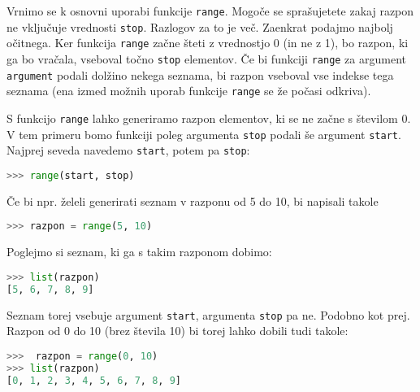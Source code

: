 Vrnimo se k osnovni uporabi funkcije \texttt{range}. Mogoče se sprašujetete zakaj razpon ne vključuje vrednosti \texttt{stop}. Razlogov za to je več. Zaenkrat podajmo najbolj očitnega. Ker funkcija \texttt{range} začne šteti z vrednostjo 0 (in ne z 1), bo razpon, ki ga bo vračala, vseboval točno \texttt{stop} elementov. Če bi funkciji \texttt{range} za argument \texttt{argument} podali dolžino nekega seznama, bi razpon vseboval vse indekse tega seznama (ena izmed možnih uporab funkcije \texttt{range} se že počasi odkriva). 

S funkcijo \texttt{range} lahko generiramo razpon elementov, ki se ne začne s številom 0. V tem primeru bomo funkciji poleg argumenta \texttt{stop} podali še argument \texttt{start}. Najprej seveda navedemo \texttt{start}, potem pa \texttt{stop}:
\begin{lstlisting}[language=Python]
>>> range(start, stop)
\end{lstlisting}
Če bi npr. želeli generirati seznam v razponu od 5 do 10, bi napisali takole
\begin{lstlisting}[language=Python]
>>> razpon = range(5, 10)
\end{lstlisting}
Poglejmo si seznam, ki ga s takim razponom dobimo:
\begin{lstlisting}[language=Python]
>>> list(razpon)
[5, 6, 7, 8, 9]
\end{lstlisting}
Seznam torej vsebuje argument \texttt{start}, argumenta \texttt{stop} pa ne. Podobno kot prej. Razpon od 0 do 10 (brez števila 10) bi torej lahko dobili tudi takole:
\begin{lstlisting}[language=Python]
>>>  razpon = range(0, 10)
>>> list(razpon)
[0, 1, 2, 3, 4, 5, 6, 7, 8, 9]
\end{lstlisting}

